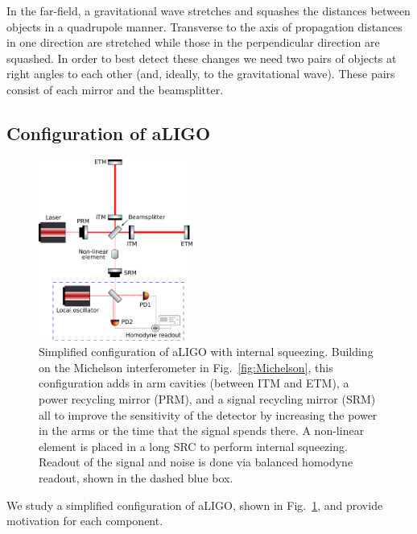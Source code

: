 \documentclass[aps,pra,superscriptaddress,reprint,nofootinbib]{revtex4-1}
\begin{document}
In the far-field, a gravitational wave stretches and squashes the distances between objects in a quadrupole manner. Transverse to the axis of propagation distances in one direction are stretched while those in the perpendicular direction are squashed. In order to best detect these changes we need two pairs of objects at right angles to each other (and, ideally, to the gravitational wave). These pairs consist of each mirror and the beamsplitter.


\subsection{Configuration of aLIGO}

\begin{figure}[ht]
	\begin{center}
	\includegraphics[width=0.45\textwidth]{figures/aLIGO_internal_squeezing.pdf}
	\end{center}
	\caption{Simplified configuration of aLIGO with internal squeezing. Building on the Michelson interferometer in Fig.~\ref{fig:Michelson}, this configuration adds in arm cavities (between ITM and ETM), a power recycling mirror (PRM), and a signal recycling mirror (SRM) all to improve the sensitivity of the detector by increasing the power in the arms or the time that the signal spends there. A non-linear element is placed in a long SRC to perform internal squeezing. Readout of the signal and noise is done via balanced homodyne readout, shown in the dashed blue box.}
	\label{fig:aLIGO_configuration}
\end{figure}

We study a simplified configuration of aLIGO, shown in Fig.~\ref{fig:aLIGO_configuration}, and provide motivation for each component.
\end{document}
